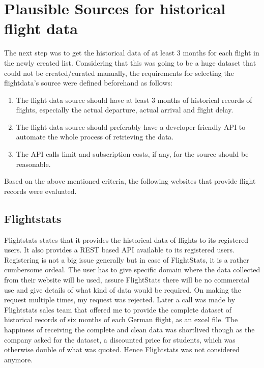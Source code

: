 \section{Plausible Sources for historical flight data}
The next step was to get the historical data of at least 3 months for each flight in the newly created list. Considering that this was going to be a huge dataset that could not be created/curated manually, the requirements for selecting the flightdata's source were defined beforehand as follows:
\begin{enumerate}
    \item The flight data source should have at least 3 months of historical records of flights, especially the actual departure, actual arrival and flight delay.
    \item The flight data source should preferably have a developer friendly API to automate the whole process of retrieving the data.
    \item The API calls limit and subscription costs, if any, for the source should be reasonable.
\end{enumerate}

Based on the above mentioned criteria, the following websites that provide flight records were evaluated.

\subsection{Flightstats}
Flightstats states that it provides the historical data of flights to its registered users. It also provides a REST based API available to its registered users. Registering is not a big issue generally but in case of FlightStats, it is a rather cumbersome ordeal. The user has to give specific domain where the data collected from their website will be used, assure FlightStats there will be no commercial use and give details of what kind of data would be required. On making the request multiple times, my request was rejected. Later a call was made by Flightstats sales team that offered me to provide the complete dataset of historical records of six months of each German flight, as an excel file. The happiness of receiving the complete and clean data was shortlived though as the company asked  for the dataset, a discounted price for students, which was otherwise double of what was quoted. Hence Flightstats was not considered anymore.

